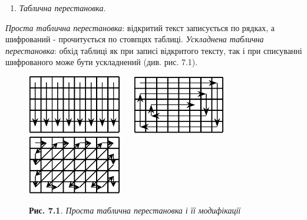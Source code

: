 \liststyleWWviiiNumxli
\setcounter{saveenum}{\value{enumi}}
\begin{enumerate}
\setcounter{enumi}{\value{saveenum}}
\item  \textit{Таблична перестановка}. 
\end{enumerate}
\textit{Проста таблична перестановка}: відкритий текст записується по рядках,  а
шифрований - прочитується по стовпцях таблиці. \textit{Ускладнена таблична
перестановка}: обхід таблиці як при записі відкритого тексту, так і при
списуванні шифрованого  може бути ускладнений (див. рис. 7.1).

  

\begin{figure}
\centering
\begin{minipage}{5.8634in}
{\centering\bfseries
 \includegraphics[width=1.6201in,height=1.0209in]{crypt-img/crypt-img64.png}
\ \  
\includegraphics[width=1.6201in,height=1.0102in]{crypt-img/crypt-img65.png} 
\ \ 
\includegraphics[width=1.6201in,height=1.0209in]{crypt-img/crypt-img66.png} 
\par}
\end{minipage}
\end{figure}
\begin{figure}
\centering
\begin{minipage}{5.4543in}
{\centering
\textbf{Рис. 7.1}\textit{. Проста таблична перестановка і її модифікації}
\par}


\bigskip
\end{minipage}
\end{figure}

\bigskip


